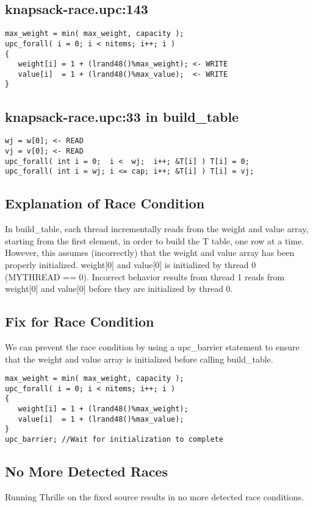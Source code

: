 \documentclass[11pt]{article} %
\begin{document}
\subsection*{knapsack-race.upc:143}
{\tiny
\begin{lstlisting}
max_weight = min( max_weight, capacity );
upc_forall( i = 0; i < nitems; i++; i )
{
   weight[i] = 1 + (lrand48()%max_weight); <- WRITE
   value[i]  = 1 + (lrand48()%max_value);  <- WRITE
}
\end{lstlisting}
}

\subsection*{knapsack-race.upc:33 in build\_table}
{\tiny
\begin{lstlisting}
wj = w[0]; <- READ
vj = v[0]; <- READ
upc_forall( int i = 0;  i <  wj;  i++; &T[i] ) T[i] = 0;
upc_forall( int i = wj; i <= cap; i++; &T[i] ) T[i] = vj;
\end{lstlisting}
}

\subsection{Explanation of Race Condition}

In build\_table, each thread incrementally reads from the weight and value array, starting from the first element, in order to build the T table, one row at a time. However, this assumes (incorrectly) that the weight and value array has been properly initialized. weight[0] and value[0] is initialized by thread 0 (MYTHREAD == 0). Incorrect behavior results from thread 1 reads from weight[0] and value[0] before they are initialized by thread 0.

\subsection{Fix for Race Condition}
We can prevent the race condition by using a upc\_barrier statement to ensure that the weight and value array is initialized before calling build\_table. 

{\tiny
\begin{lstlisting}
max_weight = min( max_weight, capacity );
upc_forall( i = 0; i < nitems; i++; i )
{
   weight[i] = 1 + (lrand48()%max_weight);
   value[i]  = 1 + (lrand48()%max_value);
}
upc_barrier; //Wait for initialization to complete
\end{lstlisting}
}

\subsection{No More Detected Races}
Running Thrille on the fixed source results in no more detected race conditions.
\end{document}
